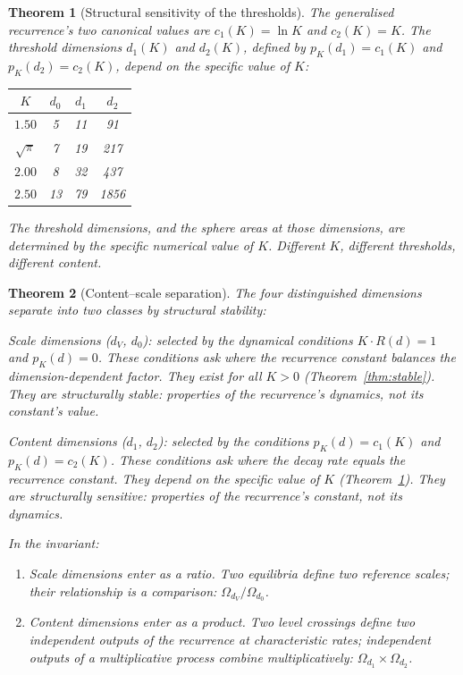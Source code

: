 \documentclass[11pt,a4paper]{article}
\newtheorem{theorem}{Theorem}[section]
\begin{document}
\begin{theorem}[Structural sensitivity of the thresholds]\label{thm:sensitive}
The generalised recurrence's two canonical values are $c_1(K) = \ln K$
and $c_2(K) = K$. The threshold dimensions $d_1(K)$ and $d_2(K)$, defined
by $p_K(d_1) = c_1(K)$ and $p_K(d_2) = c_2(K)$, depend on the specific
value of $K$:

\begin{center}
\begin{tabular}{cccc}
\toprule
$K$ & $d_0$ & $d_1$ & $d_2$ \\
\midrule
$1.50$ & 5 & 11 & 91 \\
$\sqrt{\pi}$ & 7 & 19 & 217 \\
$2.00$ & 8 & 32 & 437 \\
$2.50$ & 13 & 79 & 1856 \\
\bottomrule
\end{tabular}
\end{center}

The threshold dimensions, and the sphere areas at those dimensions, are
determined by the specific numerical value of $K$. Different $K$, different
thresholds, different content.
\end{theorem}

\begin{theorem}[Content--scale separation]\label{thm:cs}
The four distinguished dimensions separate into two classes by structural
stability:

\emph{Scale dimensions} ($d_V$, $d_0$): selected by the dynamical
conditions $K\cdot R(d) = 1$ and $p_K(d) = 0$. These conditions ask where
the recurrence constant \emph{balances} the dimension-dependent factor.
They exist for all $K > 0$ (Theorem~\ref{thm:stable}). They are
structurally stable: properties of the recurrence's dynamics, not its
constant's value.

\emph{Content dimensions} ($d_1$, $d_2$): selected by the conditions
$p_K(d) = c_1(K)$ and $p_K(d) = c_2(K)$. These conditions ask where the
decay rate \emph{equals} the recurrence constant. They depend on the
specific value of $K$ (Theorem~\ref{thm:sensitive}). They are structurally
sensitive: properties of the recurrence's constant, not its dynamics.

In the invariant:
\begin{enumerate}
\item[(i)] Scale dimensions enter as a \emph{ratio}. Two equilibria define
two reference scales; their relationship is a comparison:
$\Omega_{d_V}/\Omega_{d_0}$.

\item[(ii)] Content dimensions enter as a \emph{product}. Two level
crossings define two independent outputs of the recurrence at
characteristic rates; independent outputs of a multiplicative process
combine multiplicatively: $\Omega_{d_1}\times\Omega_{d_2}$.
\end{enumerate}
\end{theorem}
\end{document}
